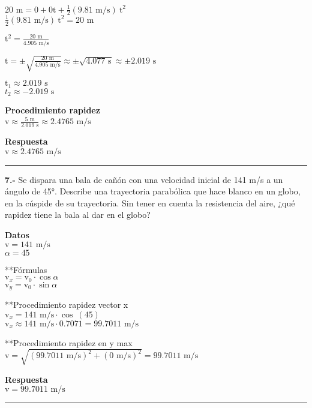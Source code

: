 \documentclass[
]{article}
\begin{document}
{\(20\text{~m} = 0 + 0\text{t} + \frac{1}{2}(9.81\text{~m/s})\ \text{t}^{2}\)}\\
{\(\frac{1}{2}(9.81\text{~m/s})\ \text{t}^{2} = 20\text{~m}\)}

{\(\text{t}^{2} = \frac{20\text{~m}}{4.905\text{~m/s}}\)}

{\(\text{t} = \pm \sqrt{\frac{20\text{~m}}{4.905\text{~m}/\text{s}}} \approx \pm \sqrt{4.077\text{~s}} \approx \pm 2.019\text{~s}\)}

{\(\text{t}_{1} \approx 2.019\text{~s}\)}\\
{\(t_{2} \approx - 2.019\text{~s}\)}

\textbf{Procedimiento rapidez}\\
{\(\text{v} \approx \frac{5\text{~m}}{2.019\text{~s}} \approx 2.4765\text{~m/s}\)}

\textbf{Respuesta}\\
{\(\text{v} \approx 2.4765\text{~m/s}\)}

\begin{center}\rule{0.5\linewidth}{0.5pt}\end{center}

\textbf{7.-} Se dispara una bala de cañón con una velocidad inicial de
141 m/s a un ángulo de 45°. Describe una trayectoria parabólica que hace
blanco en un globo, en la cúspide de su trayectoria. Sin tener en cuenta
la resistencia del aire, ¿qué rapidez tiene la bala al dar en el globo?

\textbf{Datos}\\
{\(\text{v} = 141\text{~m/s}\)}\\
{\(\alpha = 45\)}

**Fórmulas\\
{\(\text{v}_{x} = \text{v}_{0} \cdot \cos\alpha\)}\\
{\(\text{v}_{y} = \text{v}_{0} \cdot \sin\alpha\)}

**Procedimiento rapidez vector x\\
{\(\text{v}_{x} = 141\text{~m/s} \cdot \cos\ (45)\)}\\
{\(\text{v}_{x} \approx 141\text{~m/s} \cdot 0.7071 = 99.7011\text{~m/s}\)}

**Procedimiento rapidez en y max\\
{\(\text{v} = \sqrt{(99.7011\text{~m/s})^{2} + (0\text{~m/s})^{2}} = 99.7011\text{~m/s}\)}

\textbf{Respuesta}\\
{\(\text{v} = 99.7011\text{~m/s}\)}

\begin{center}\rule{0.5\linewidth}{0.5pt}\end{center}
\end{document}

